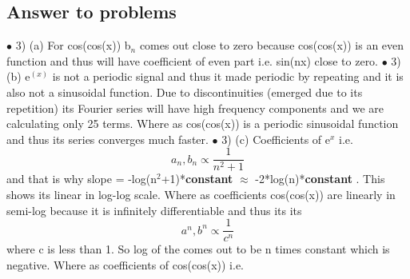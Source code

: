 \documentclass[a4paper]{article}
\begin{document}
\subsection{Answer to problems}
$\bullet$
3) (a) For cos(cos(x)) b$_{n}$ comes out close to zero because cos(cos(x)) is an even function and thus will have coefficient of even part i.e. sin(nx) close to zero.
\linebreak
$\bullet$
3) (b)	e$^(x)$ is not a periodic signal and thus it made periodic by repeating and it is also not a sinusoidal function. Due to discontinuities (emerged due to its repetition) its Fourier series will have high frequency components and we are calculating only 25 terms. Where as cos(cos(x)) is a periodic sinusoidal function and thus its series converges much faster. 
\linebreak
$\bullet$
3) (c) Coefficients of e$^{x}$ i.e. $$ a_{n} ,b_{n} \propto \frac{1}{n^{2}+1} $$
and that is why slope = -log(n$^{2}$+1)*\textbf{constant} $\approx$ -2*log(n)*\textbf{constant} . This shows its linear in log-log scale. Where as coefficients cos(cos(x)) are linearly in semi-log because it is infinitely differentiable and thus its its $$ a^{n},b^{n} \propto \frac{1}{c^{n}} $$
where c is less than 1. So log of the comes out to be n times constant which is negative.
\linebreak
Where as coefficients of cos(cos(x)) i.e. $$ $$
\end{document}
